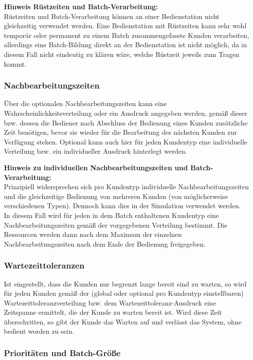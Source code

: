 \textbf{Hinweis Rüstzeiten und Batch-Verarbeitung:}~\\
Rüstzeiten und Batch-Verarbeitung können an einer Bedienstation nicht gleichzeitig
verwendet werden. Eine Bedienstation mit Rüstzeiten kann sehr wohl temporär oder permanent
zu einem Batch zusammengefasste Kunden verarbeiten, allerdings eine Batch-Bildung direkt an
der Bedienstation ist nicht möglich, da in diesem Fall nicht eindeutig zu klären wäre,
welche Rüstzeit jeweils zum Tragen kommt.

\subsubsection*{Nachbearbeitungszeiten}

Über die optionalen Nachbearbeitungszeiten kann eine Wahrscheinlichkeitsverteilung oder ein Ausdruck angegeben werden, gemäß
dieser bzw. dessen die Bediener nach Abschluss der Bedienung eines Kunden zusätzliche Zeit benötigen, bevor sie wieder für
die Bearbeitung des nächsten Kunden zur Verfügung stehen. Optional kann auch hier für jeden Kundentyp eine individuelle Verteilung
bzw. ein individueller Ausdruck hinterlegt werden.

\textbf{Hinweis zu individuellen Nachbearbeitungszeiten und Batch-Verarbeitung:}~\\
Prinzipiell widersprechen sich pro Kundentyp individuelle Nachbearbeitungszeiten und die gleichzeitige Bedienung von mehreren Kunden
(von möglicherweise verschiedenen Typen). Dennoch kann dies in der Simulation verwendet werden. In diesem Fall wird für jeden
in dem Batch enthaltenen Kundentyp eine Nachbearbeitungszeiten gemäß der vorgegebenen Verteilung bestimmt. Die Ressourcen werden
dann nach dem Maximum der einzelnen Nachbearbeitungszeiten nach dem Ende der Bedienung freigegeben.

\subsubsection*{Wartezeittoleranzen}

Ist eingestellt, dass die Kunden nur begrenzt lange bereit sind zu warten, so wird für jeden Kunden gemäß der (global oder optional
pro Kundentyp einstellbaren) Wartezeittoleranzverteilung bzw. dem Wartezeittoleranz-Ausdruck eine Zeitspanne ermittelt, die der
Kunde zu warten bereit ist. Wird diese Zeit überschritten, so gibt der Kunde das Warten auf und verlässt das System,
ohne bedient worden zu sein.

\subsubsection*{Prioritäten und Batch-Größe}

